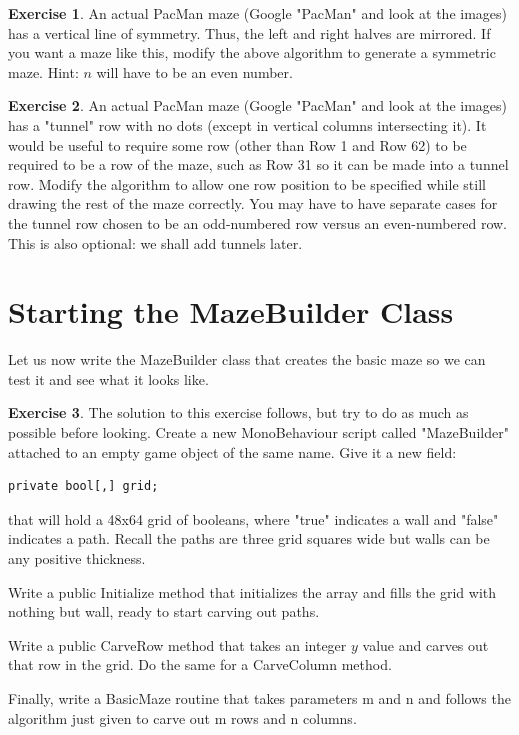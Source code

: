\documentclass[12pt]{amsbook}
\theoremstyle{definition}
\newtheorem{exercise}{Exercise}[chapter]
\theoremstyle{remark}
\numberwithin{figure}{chapter}
\numberwithin{table}{chapter}
\numberwithin{section}{chapter}
\numberwithin{equation}{section}
\begin{document}
\begin{exercise}
An actual PacMan maze (Google "PacMan" and look at the images) has a vertical line of symmetry.  Thus, the left and right halves are mirrored.  If you want a maze like this, modify the above algorithm to generate a symmetric maze.  Hint: $n$ will have to be an even number.
\end{exercise}

\begin{exercise}
An actual PacMan maze (Google "PacMan" and look at the images) has a "tunnel" row with no dots (except in vertical columns intersecting it).  It would be useful to require some row (other than Row 1 and Row 62) to be required to be a row of the maze, such as Row 31 so it can be made into a tunnel row.  Modify the algorithm to allow one row position to be specified while still drawing the rest of the maze correctly.  You may have to have separate cases for the tunnel row chosen to be an odd-numbered row versus an even-numbered row.  This is also optional: we shall add tunnels later.
\end{exercise}

\section{Starting the MazeBuilder Class}

Let us now write the MazeBuilder class that creates the basic maze so we can test it and see what it looks like.  

\begin{exercise}
The solution to this exercise follows, but try to do as much as possible before looking.  Create a new MonoBehaviour script called "MazeBuilder" attached to an empty game object of the same name.  Give it a new field:

\begin{verbatim}
private bool[,] grid;
\end{verbatim}
that will hold a 48x64 grid of booleans, where "true" indicates a wall and "false" indicates a path.  Recall the paths are three grid squares wide but walls can be any positive thickness.

Write a public Initialize method that initializes the array and fills the grid with nothing but wall, ready to start carving out paths.

Write a public CarveRow method that takes an integer $y$ value and carves out that row in the grid.  Do the same for a CarveColumn method. 

Finally, write a BasicMaze routine that takes parameters m and n and follows the algorithm just given to carve out m rows and n columns.
\end{exercise}
\end{document}
